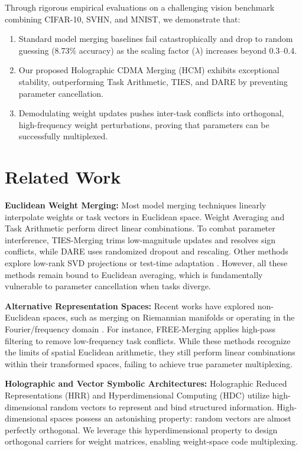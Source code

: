 \documentclass{article}
\begin{document}
Through rigorous empirical evaluations on a challenging vision benchmark combining CIFAR-10, SVHN, and MNIST, we demonstrate that:
\begin{enumerate}
    \item Standard model merging baselines fail catastrophically and drop to random guessing (8.73\% accuracy) as the scaling factor ($\lambda$) increases beyond 0.3--0.4.
    \item Our proposed Holographic CDMA Merging (HCM) exhibits exceptional stability, outperforming Task Arithmetic, TIES, and DARE by preventing parameter cancellation.
    \item Demodulating weight updates pushes inter-task conflicts into orthogonal, high-frequency weight perturbations, proving that parameters can be successfully multiplexed.
\end{enumerate}

\section{Related Work}
\label{sec:related}
\textbf{Euclidean Weight Merging:} Most model merging techniques linearly interpolate weights or task vectors in Euclidean space. Weight Averaging \cite{wortsman22_soups} and Task Arithmetic \cite{ilharco22_editing} perform direct linear combinations. To combat parameter interference, TIES-Merging \cite{yadav23_ties} trims low-magnitude updates and resolves sign conflicts, while DARE \cite{yu24_dare} uses randomized dropout and rescaling. Other methods explore low-rank SVD projections \cite{marczak25_saim} or test-time adaptation \cite{jung24_symerge}. However, all these methods remain bound to Euclidean averaging, which is fundamentally vulnerable to parameter cancellation when tasks diverge.

\textbf{Alternative Representation Spaces:} Recent works have explored non-Euclidean spaces, such as merging on Riemannian manifolds \cite{yang26_orthomerge} or operating in the Fourier/frequency domain \cite{zheng24_freemerging,huang25_deltadct}. For instance, FREE-Merging \cite{zheng24_freemerging} applies high-pass filtering to remove low-frequency task conflicts. While these methods recognize the limits of spatial Euclidean arithmetic, they still perform linear combinations within their transformed spaces, failing to achieve true parameter multiplexing.

\textbf{Holographic and Vector Symbolic Architectures:} Holographic Reduced Representations (HRR) \cite{plate1995holographic} and Hyperdimensional Computing (HDC) \cite{kanerva2009hyperdimensional} utilize high-dimensional random vectors to represent and bind structured information. High-dimensional spaces possess an astonishing property: random vectors are almost perfectly orthogonal. We leverage this hyperdimensional property to design orthogonal carriers for weight matrices, enabling weight-space code multiplexing.
\end{document}
